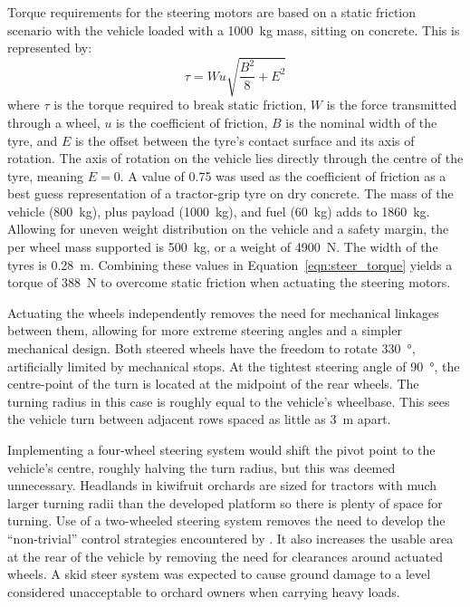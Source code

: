 \documentclass[preprint,authoryear,12pt]{elsarticle}
\begin{document}
        Torque requirements for the steering motors are based on a static friction scenario with the vehicle loaded with a \SI{1000}{\kilo\gram} mass, sitting on concrete.
        This is represented by:
        \begin{equation}
        \label{eqn:steer_torque}
        \tau = W u \sqrt{\frac{B^2}{8} + E^2}
        \end{equation}
        where $\tau$ is the torque required to break static friction, $W$ is the force transmitted through a wheel, $u$ is the coefficient of friction, $B$ is the nominal width of the tyre, and $E$ is the offset between the tyre's contact surface and its axis of rotation.
        The axis of rotation on the vehicle lies directly through the centre of the tyre, meaning $E=0$.
        A value of 0.75 was used as the coefficient of friction as a best guess representation of a tractor-grip tyre on dry concrete.
        The mass of the vehicle (\SI{800}{\kilo\gram}), plus payload (\SI{1000}{\kilo\gram}), and fuel (\SI{60}{\kilo\gram}) adds to \SI{1860}{\kilo\gram}.
        Allowing for uneven weight distribution on the vehicle and a safety margin, the per wheel mass supported is \SI{500}{\kilo\gram}, or a weight of \SI{4900}{\newton}.
        The width of the tyres is \SI{0.28}{\meter}.
        Combining these values in Equation~\ref{eqn:steer_torque} yields a torque of \SI{388}{\newton} to overcome static friction when actuating the steering motors.

        Actuating the wheels independently removes the need for mechanical linkages between them, allowing for more extreme steering angles and a simpler mechanical design.
        Both steered wheels have the freedom to rotate \SI{330}{\degree}, artificially limited by mechanical stops.
        At the tightest steering angle of \SI{90}{\degree}, the centre-point of the turn is located at the midpoint of the rear wheels.
        The turning radius in this case is roughly equal to the vehicle's wheelbase.
        This sees the vehicle turn between adjacent rows spaced as little as \SI{3}{\meter} apart.

        Implementing a four-wheel steering system would shift the pivot point to the vehicle's centre, roughly halving the turn radius, but this was deemed unnecessary.
        Headlands in kiwifruit orchards are sized for tractors with much larger turning radii than the developed platform so there is plenty of space for turning.
        Use of a two-wheeled steering system removes the need to develop the ``non-trivial'' control strategies encountered by \cite{Bak2004}.
        It also increases the usable area at the rear of the vehicle by removing the need for clearances around actuated wheels.
        A skid steer system was expected to cause ground damage to a level considered unacceptable to orchard owners when carrying heavy loads.
\end{document}
